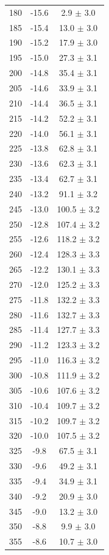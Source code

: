 \documentclass[a4paper,12pt]{article}
\begin{document}
\begin{center}
\begin{longtable}{|c|c|c|}
180 & -15.6 & 2.9 $\pm$  3.0 \\ 
185 & -15.4 & 13.0 $\pm$  3.0 \\ 
190 & -15.2 & 17.9 $\pm$  3.0 \\ 
195 & -15.0 & 27.3 $\pm$  3.1 \\ 
200 & -14.8 & 35.4 $\pm$  3.1 \\ 
205 & -14.6 & 33.9 $\pm$  3.1 \\ 
210 & -14.4 & 36.5 $\pm$  3.1 \\ 
215 & -14.2 & 52.2 $\pm$  3.1 \\ 
220 & -14.0 & 56.1 $\pm$  3.1 \\ 
225 & -13.8 & 62.8 $\pm$  3.1 \\ 
230 & -13.6 & 62.3 $\pm$  3.1 \\ 
235 & -13.4 & 62.7 $\pm$  3.1 \\ 
240 & -13.2 & 91.1 $\pm$  3.2 \\ 
245 & -13.0 & 100.5 $\pm$  3.2 \\ 
250 & -12.8 & 107.4 $\pm$  3.2 \\ 
255 & -12.6 & 118.2 $\pm$  3.2 \\ 
260 & -12.4 & 128.3 $\pm$  3.3 \\ 
265 & -12.2 & 130.1 $\pm$  3.3 \\ 
270 & -12.0 & 125.2 $\pm$  3.3 \\ 
275 & -11.8 & 132.2 $\pm$  3.3 \\ 
280 & -11.6 & 132.7 $\pm$  3.3 \\ 
285 & -11.4 & 127.7 $\pm$  3.3 \\ 
290 & -11.2 & 123.3 $\pm$  3.2 \\ 
295 & -11.0 & 116.3 $\pm$  3.2 \\ 
300 & -10.8 & 111.9 $\pm$  3.2 \\ 
305 & -10.6 & 107.6 $\pm$  3.2 \\ 
310 & -10.4 & 109.7 $\pm$  3.2 \\ 
315 & -10.2 & 109.7 $\pm$  3.2 \\ 
320 & -10.0 & 107.5 $\pm$  3.2 \\ 
325 & -9.8 & 67.5 $\pm$  3.1 \\ 
330 & -9.6 & 49.2 $\pm$  3.1 \\ 
335 & -9.4 & 34.9 $\pm$  3.1 \\ 
340 & -9.2 & 20.9 $\pm$  3.0 \\ 
345 & -9.0 & 13.2 $\pm$  3.0 \\ 
350 & -8.8 & 9.9 $\pm$  3.0 \\ 
355 & -8.6 & 10.7 $\pm$  3.0 \\ 

\end{longtable}
\end{center}
\end{document}
